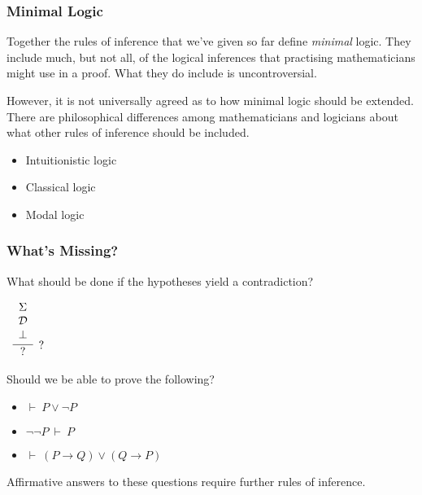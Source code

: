 \documentclass{beamer}
\theoremstyle{indentDefn} \newtheorem{defn}[]{Definition}
\begin{document}
\begin{frame}
	\frametitle{Minimal Logic}
	
	Together the rules of inference that we've given so far define \emph{minimal} logic. They include much, but not all, of the logical inferences that practising mathematicians might use in a proof. What they do include is uncontroversial.
	
	\vspace{0.5cm}
	
	However, it is not universally agreed as to how minimal logic should be extended. There are philosophical differences among mathematicians and logicians about what other rules of inference should be included. 
	
	\begin{itemize}
		\item Intuitionistic logic
		\item Classical logic 
		\item Modal logic		
	\end{itemize}	
\end{frame}

\begin{frame}
  \frametitle{What's Missing?}

	What should be done if the hypotheses yield a contradiction? 

	\begin{center}
		$\begin{array}{c}
		\infer[?]{?}{\begin{array}{c} \Sigma \\ \mathcal{D} \\ \bot \end{array}}
		\end{array}$
	\end{center}

	Should we be able to prove the following? 
	\begin{itemize}
		\item[] $\vdash \ P \lor \lnot P$
		\item[] $\lnot \lnot P \ \vdash \ P$
		\item[] $\vdash \ (P \to Q) \lor (Q \to P)$
	\end{itemize}

	Affirmative answers to these questions require further rules of inference. 

\end{frame}
\end{document}
